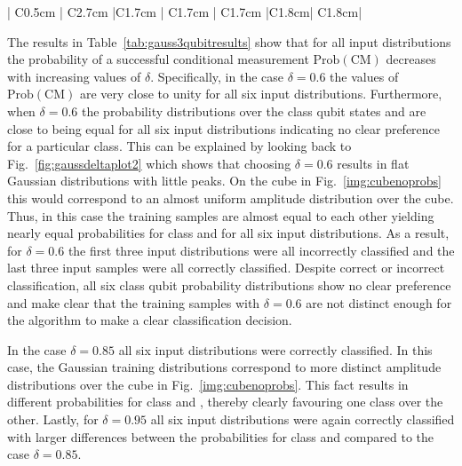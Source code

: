 \begin{table}[H]
\begin{tabular}{| C{0.5cm} | C{2.7cm} |C{1.7cm} | C{1.7cm} | C{1.7cm} |C{1.8cm}| C{1.8cm}|}
      \bottomrule
    \end{tabular}
    \caption{\label{tab:gauss3qubitresults} Amplitude-based kNN algorithm classification results after 1000 runs for various Gaussian distributions centered around six different three-qubit patterns. The Gaussian distributions were created using the coin gate $C(\delta)$. For each pattern three different distributions were prepared and classified by changing the parameter $\delta$: The results for $\delta = 0.6$ are always on top and marked with an empty circle ($\circ$), results for $\delta = 0.85$ are always in the middle marked with a filled circle ($\bullet$) and results for $\delta = 0.95$ are always at the bottom and marked with a triangle ($\triangleright$)}
\end{table}

The results in Table~\ref{tab:gauss3qubitresults} show that for all input distributions the probability of a successful conditional measurement $\mathrm{Prob}(\mathrm{CM})$ decreases with increasing values of $\delta$. Specifically, in the case $\delta = 0.6$ the values of $\mathrm{Prob}(\mathrm{CM})$ are very close to unity for all six input distributions. Furthermore, when $\delta = 0.6$ the probability distributions over the class qubit states \0 and \1 are close to being equal for all six input distributions indicating no clear preference for a particular class. This can be explained by looking back to Fig.~\ref{fig:gaussdeltaplot2} which shows that choosing $\delta = 0.6$ results in flat Gaussian distributions with little peaks. On the cube in Fig.~\ref{img:cubenoprobs} this would correspond to an almost uniform amplitude distribution over the cube. Thus, in this case the training samples are almost equal to each other yielding nearly equal probabilities for class \0 and \1 for all six input distributions. As a result, for $\delta = 0.6$ the first three input distributions were all incorrectly classified and the last three input samples were all correctly classified. Despite correct or incorrect classification, all six class qubit probability distributions show no clear preference and make clear that the training samples with $\delta = 0.6$ are not distinct enough for the algorithm to make a clear classification decision.

In the case $\delta = 0.85$ all six input distributions were correctly classified. In this case, the Gaussian training distributions correspond to more distinct amplitude distributions over the cube in Fig.~\ref{img:cubenoprobs}. This fact results in different probabilities for class \0 and \1, thereby clearly favouring one class over the other. Lastly, for $\delta = 0.95$ all six input distributions were again correctly classified with larger differences between the probabilities for class \0 and \1 compared to the case $\delta = 0.85$.


